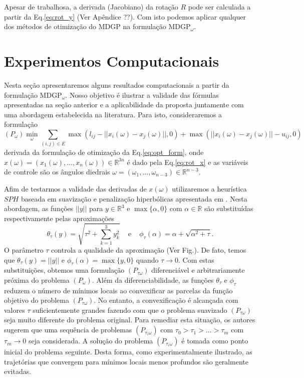 \documentclass[10pt,a4paper]{article}
\newcommand{\R}{\mathbb{R}}
\begin{document}
Apesar de trabalhosa, a derivada (Jacobiano) da rotação $R$ pode ser calculada a partir da Eq.\eqref{eq:rot_y} (Ver Apêndice ??). Com isto podemos aplicar qualquer dos métodos de otimização do MDGP na formulação MDGP$_\omega$.



\section{Experimentos Computacionais}\label{sec:numexp}
Nesta seção apresentaremos alguns resultados computacionais a partir da formulação MDGP$_\omega$. Nosso objetivo é ilustrar a validade das fórmulas apresentadas na seção anterior e a aplicabilidade da proposta juntamente com uma abordagem estabelecida na literatura. Para isto, consideraremos a formulação
\begin{equation}
(P_\omega) \min_\omega \sum_{(i,j)\in E} \max(l_{ij} - ||x_i(\omega)-x_j(\omega)||, 0) + \max(||x_i(\omega)-x_j(\omega)|| - u_{ij},0)
\end{equation}
derivada da formulação de otimização da Eq.\eqref{eq:opt_form}, onde $x(\omega)=(x_1(\omega),\ldots,x_n(\omega))\in\R^{3n}$ é dado pela Eq.\eqref{eq:rot_x} e as variáveis de controle são os ângulos diedrais $\omega=(\omega_1,\ldots,\omega_{n-3})\in\R^{n-3}$. 

Afim de testarmos a validade das derivadas de $x(\omega)$ utilizaremos a heurística $SPH$ baseada em suavização e penalização hiperbólicas apresentada em \cite{bibid}. Nesta abordagem, as funções $||y||$ para $y\in\R^3$ e $\max\{\alpha,0\}$ com $\alpha\in\R$ são substituídas respectivamente pelas aproximações 
\begin{equation}
\theta_\tau(y)=\sqrt{\tau^2+\sum_{k=1}^3y_k^2}\;\;\;\mbox{ e }\;\;\; \phi_\tau(\alpha)=\alpha + \sqrt{\alpha^2 + \tau}.
\end{equation}
O parâmetro $\tau$ controla a qualidade da aproximação (Ver Fig.). De fato, temos que $\theta_\tau(y)=||y||$ e $\phi_\tau(\alpha)=\max\{y,0\}$ quando $\tau\to 0$. Com estas substituições, obtemos uma formulação $(P_{\tau\omega})$ diferenciável e arbitrariamente próxima do problema $(P_\omega)$. Além da diferenciabilidade, as funções $\theta_\tau$ e $\phi_\tau$ reduzem o número de mínimos locais ao convexificar as parcelas da função objetivo do problema $(P_{\tau\omega})$. No entanto, a convexificação é alcançada com valores $\tau$ suficientemente grandes fazendo com que o problema suavizado $(P_{\tau\omega})$ seja muito diferente do problema original. Para remediar esta situação, os autores sugerem que uma sequência de problemas $(P_{\tau_i\omega})$ com $\tau_0>\tau_1 > \ldots > \tau_m$ com $\tau_m\to 0$ seja considerada. A solução do problema $(P_{\tau_i\omega})$ é tomada como ponto inicial do problema seguinte. Desta forma, como experimentalmente ilustrado, as trajetórias que convergem para mínimos locais menos profundos são geralmente evitadas.
\end{document}
